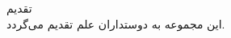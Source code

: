 \begin{acknowledgementpage}

\vspace{4cm}

{\nastaliq	
تقدیم
}
\\[2cm]

این مجموعه به دوستداران علم تقدیم می‌گردد.




\end{acknowledgementpage}
